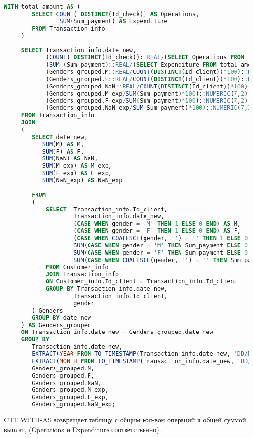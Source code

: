 \documentclass[12pt, a3paper]{article}
\begin{document}
\begin{lstlisting}[language=SQL]
    WITH total_amount AS (
        SELECT COUNT( DISTINCT(Id_check)) AS Operations,
                SUM(Sum_payment) AS Expenditure
        FROM Transaction_info
     )
    
     SELECT Transaction_info.date_new, 
            (COUNT( DISTINCT(Id_check))::REAL/(SELECT Operations FROM total_amount)*100)::NUMERIC(7,2) AS Operations_ratio,
            (SUM (Sum_payment)::REAL/(SELECT Expenditure FROM total_amount)*100)::NUMERIC(7,2) AS expenditure_ratio,
            (Genders_grouped.M::REAL/COUNT(DISTINCT(Id_client))*100)::NUMERIC(7,2) AS M_ratio,
            (Genders_grouped.F::REAL/COUNT(DISTINCT(Id_client))*100)::NUMERIC(7,2) AS F_ratio,
            (Genders_grouped.NaN::REAL/COUNT(DISTINCT(Id_client))*100)::NUMERIC(7,2) AS NaN_ratio,
            (Genders_grouped.M_exp/SUM(Sum_payment)*100)::NUMERIC(7,2) AS M_exp_ratio,
            (Genders_grouped.F_exp/SUM(Sum_payment)*100)::NUMERIC(7,2) AS F_exp_ratio,
            (Genders_grouped.NaN_exp/SUM(Sum_payment)*100)::NUMERIC(7,2) AS NaN_exp_ratio
     FROM Transaction_info
     JOIN
     (
        SELECT date_new, 
           SUM(M) AS M,
           SUM(F) AS F,
           SUM(NaN) AS NaN,
           SUM(M_exp) AS M_exp,
           SUM(F_exp) AS F_exp,
           SUM(NaN_exp) AS NaN_exp
           
        FROM
        (
            SELECT  Transaction_info.Id_client,
                    Transaction_info.date_new,
                    (CASE WHEN gender = 'M' THEN 1 ELSE 0 END) AS M,
                    (CASE WHEN gender = 'F' THEN 1 ELSE 0 END) AS F,
                    (CASE WHEN COALESCE(gender, '') = '' THEN 1 ELSE 0 END) AS NaN,
                    SUM(CASE WHEN gender = 'M' THEN Sum_payment ELSE 0 END) AS M_exp,
                    SUM(CASE WHEN gender = 'F' THEN Sum_payment ELSE 0 END) AS F_exp,
                    SUM(CASE WHEN COALESCE(gender, '') = '' THEN Sum_payment ELSE 0 END) AS NaN_exp
            FROM Customer_info
            JOIN Transaction_info
            ON Customer_info.Id_client = Transaction_info.Id_client
            GROUP BY Transaction_info.date_new,
                    Transaction_info.Id_client,
                    gender
        ) Genders
        GROUP BY date_new
     ) AS Genders_grouped
     ON Transaction_info.date_new = Genders_grouped.date_new
     GROUP BY 
        Transaction_info.date_new,
        EXTRACT(YEAR FROM TO_TIMESTAMP(Transaction_info.date_new, 'DD/MM/YYYY')), 
        EXTRACT(MONTH FROM TO_TIMESTAMP(Transaction_info.date_new, 'DD/MM/YYYY')),
        Genders_grouped.M,
        Genders_grouped.F,
        Genders_grouped.NaN,
        Genders_grouped.M_exp,
        Genders_grouped.F_exp,
        Genders_grouped.NaN_exp;
\end{lstlisting}
CTE WITH-AS возвращает таблицу с общим кол-вом операций и общей суммой выплат,
(Operations и Expenditure соответственно).
\end{document}
